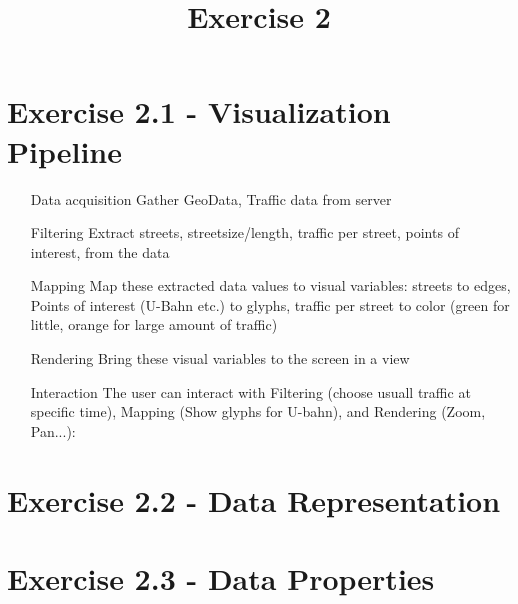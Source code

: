 \documentclass[a4paper]{article}
\date{}
\author{}
\title{Exercise 2}
\begin{document}
	
	\maketitle 
	\thispagestyle{fancy}
	
	\section*{Exercise 2.1 - Visualization Pipeline}
	\begin{itemize}
		\item[Data acquisition] Gather GeoData, Traffic data from server
		\item[Filtering] Extract streets, streetsize/length, traffic per street, points of interest, from the data 
		\item[Mapping] Map these extracted data values to visual variables: streets to edges, Points of interest (U-Bahn etc.) to glyphs, traffic per street to color (green for little, orange for large amount of traffic)
		\item[Rendering] Bring these visual variables to the screen in a view
		\item[Interaction] The user can interact with Filtering (choose usuall traffic at specific time), Mapping (Show glyphs for U-bahn), and Rendering (Zoom, Pan...): 
		
	\end{itemize}
	
	\section*{Exercise 2.2 - Data Representation}
	
	\section*{Exercise 2.3 - Data Properties}
\end{document}
